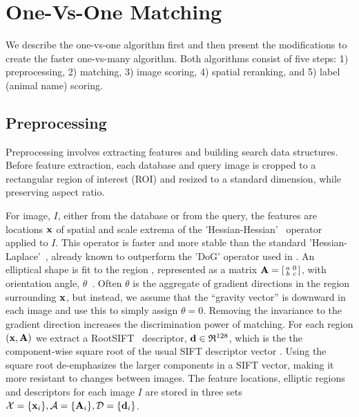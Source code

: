 
\section{One-Vs-One Matching}

We describe the one-vs-one algorithm first and then present the
modifications to create the faster one-vs-many algorithm.  Both
algorithms consist of five steps: 1) preprocessing, 2) matching, 3)
image scoring, 4) spatial reranking, and 5) label (animal name)
scoring.

\subsection{Preprocessing}

Preprocessing involves extracting features and building search data structures.
Before feature extraction, each database and query image is cropped to a rectangular region of interest (ROI) and
resized to a standard dimension, while preserving aspect ratio.

For image, $I$, either from the database or from the query, the
features are locations $\mathbf{x}$ of spatial and scale extrema of the
'Hessian-Hessian'~\cite{cvpr09PerdochEfficRep} operator applied to
$I$.  This operator is faster and more stable than the standard
'Hessian-Laplace'~\cite{ijcv05MikolajczykAffineRegion}, already
known to outperform the 'DoG' operator used in \cite{11BoldgerWILDID}.  An
elliptical shape is fit to the region
\cite{ijcv05MikolajczykAffineRegion}, represented as a matrix
${\mathbf A}=[\begin{smallmatrix} a&0\\ b&c \end{smallmatrix}]$, with orientation angle, $\theta$~\cite{cvpr09PerdochEfficRep}.  Often $\theta$ is the aggregate of gradient
directions in the region surrounding $\mathbf{x}$, but instead, we assume
that the ``gravity vector'' is downward in each image and use this to
simply assign $\theta =0$. Removing the invariance to the gradient direction increases the
discrimination power of matching. For each region $(\mathbf{x},
{\mathbf A})$ we extract a RootSIFT~\cite{cvpr12ArandjelovicThreeThings} descriptor, $\mathbf{d} \in
\mathfrak{R}^{128}$, which is the
the component-wise square root of the usual SIFT descriptor vector
\cite{ijcv04LoweSIFT}.  Using the square root de-emphasizes the larger
components in a SIFT vector, making it more resistant to changes
between images.  The feature locations, elliptic regions and
descriptors for each image $I$ are stored in three
sets $\mathcal{X} = \{ \mathbf{x}_i \}, \mathcal{A} = \{ {\mathbf A}_i \}, \mathcal{D} = \{\mathbf{d}_i \}$.

